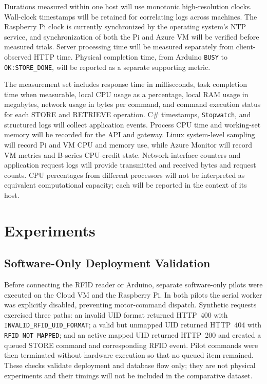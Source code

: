\documentclass[conference]{IEEEtran}
\begin{document}
Durations measured within one host will use monotonic high-resolution clocks. Wall-clock timestamps will be retained for correlating logs across machines. The Raspberry Pi clock is currently synchronized by the operating system's NTP service, and synchronization of both the Pi and Azure VM will be verified before measured trials. Server processing time will be measured separately from client-observed HTTP time. Physical completion time, from Arduino \texttt{BUSY} to \texttt{OK:STORE\_DONE}, will be reported as a separate supporting metric.

The measurement set includes response time in milliseconds, task completion time when measurable, local CPU usage as a percentage, local RAM usage in megabytes, network usage in bytes per command, and command execution status for each STORE and RETRIEVE operation. C\# timestamps, \texttt{Stopwatch}, and structured logs will collect application events. Process CPU time and working-set memory will be recorded for the API and gateway. Linux system-level sampling will record Pi and VM CPU and memory use, while Azure Monitor will record VM metrics and B-series CPU-credit state. Network-interface counters and application request logs will provide transmitted and received bytes and request counts. CPU percentages from different processors will not be interpreted as equivalent computational capacity; each will be reported in the context of its host.

\section{Experiments}

\subsection{Software-Only Deployment Validation}
Before connecting the RFID reader or Arduino, separate software-only pilots were executed on the Cloud VM and the Raspberry Pi. In both pilots the serial worker was explicitly disabled, preventing motor-command dispatch. Synthetic requests exercised three paths: an invalid UID format returned HTTP~400 with \texttt{INVALID\_RFID\_UID\_FORMAT}; a valid but unmapped UID returned HTTP~404 with \texttt{RFID\_NOT\_MAPPED}; and an active mapped UID returned HTTP~200 and created a queued STORE command and corresponding RFID event. Pilot commands were then terminated without hardware execution so that no queued item remained. These checks validate deployment and database flow only; they are not physical experiments and their timings will not be included in the comparative dataset.
\end{document}
